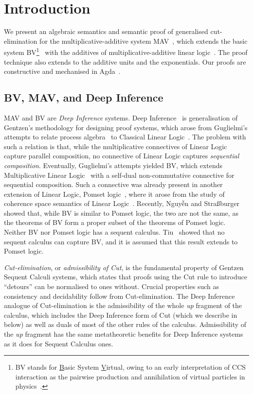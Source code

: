 \section{Introduction}\label{sec:introduction}

We present an algebraic semantics and semantic proof of generalised cut-elimination for the multiplicative-additive system MAV~\cite{Horne15:mav}, which extends the basic system BV\footnote{
      BV stands for \underline{B}asic System \underline{V}irtual, owing to an early interpretation of CCS interaction as the pairwise production and annihilation of virtual particles in physics~\cite[]{Horne15:mav}.
}~\cite{Guglielmi99:bv,Guglielmi07:sis} with the additives of multiplicative-additive linear logic~\cite[MALL]{Girard87:ll}. The proof technique also extends to the additive units and the exponentials.
Our proofs are constructive and mechanised in Agda~\cite{Agda264}.

\subsection{BV, MAV, and Deep Inference}

MAV and BV are \emph{Deep Inference} systems. Deep Inference~\cite{Guglielmi14:di} is generalisation of Gentzen's methodology for designing proof systems, which arose from Guglielmi's attempts to relate process algebra~\cite[CCS]{Milner80:CCS,Milner89:CC} to Classical Linear Logic~\cite[CLL]{Girard87:ll}.
The problem with such a relation is that, while the multiplicative connectives of Linear Logic capture parallel composition, no connective of Linear Logic captures \emph{sequential composition}.
Eventually, Guglielmi's attempts yielded BV, which extends Multiplicative Linear Logic~\cite[MLL]{Girard87:ll} with a self-dual non-commutative connective for sequential composition.
Such a connective was already present in another extension of Linear Logic, Pomset logic~\cite{Retore97:pomset}, where it arose from the study of coherence space semantics of Linear Logic~\cite[]{GirardTL89:proofs}.
Recently, Nguyễn and Stra{\ss}burger~\cite{NguyenS22:bvisnotpl,NguyenS23:complexity} showed that, while BV is similar to Pomset logic, the two are not the same, as the theorems of BV form a proper subset of the theorems of Pomset logic.
Neither BV nor Pomset logic has a sequent calculus. Tiu~\cite{Tiu06:sisii} showed that no sequent calculus can capture BV, and it is assumed that this result extends to Pomset logic.

\emph{Cut-elimination}, or \emph{admissibility of Cut}, is the fundamental property of Gentzen Sequent Calculi systems, which states that proofs using the Cut rule to introduce ``detours'' can be normalised to ones without. Crucial properties such as consistency and decidability follow from Cut-elimination. The Deep Inference analogue of Cut-elimination is the admissibility of the whole \emph{up} fragment of the calculus, which includes the Deep Inference form of Cut (which we describe in  below) as well as duals of most of the other rules of the calculus. Admissibility of the \emph{up} fragment has the same metatheoretic benefits for Deep Inference systems as it does for Sequent Calculus ones.

